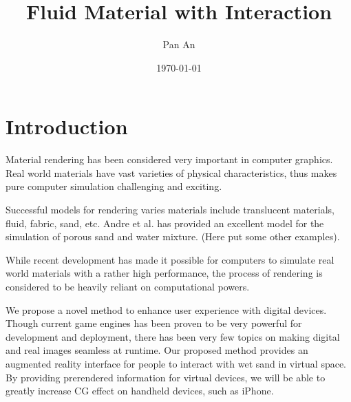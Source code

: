 \documentclass[dvips,12pt]{article}
\begin{document}

\title{Fluid Material with Interaction}
\author{Pan An}
\date{\today}



\maketitle


\section{Introduction}


Material rendering has been considered very important in computer
graphics. Real world materials have vast varieties of physical
characteristics, thus makes pure computer simulation challenging and
exciting.

Successful models for rendering varies materials include translucent
materials, fluid, fabric, sand, etc. Andre et al. has provided an
excellent model for the simulation of porous sand and water
mixture. (Here put some other examples).

While recent development has made it possible for computers to
simulate real world materials with a rather high performance, the
process of rendering is considered to be heavily reliant on
computational powers. 

We propose a novel method to enhance user experience with digital
devices. Though current game engines has been proven to be very
powerful for development and deployment, there has been very few
topics on making digital and real images seamless at runtime. Our
proposed method provides an augmented reality interface for people to
interact with wet sand in virtual space. By providing prerendered
information for virtual devices, we will be able to greatly increase
CG effect on handheld devices, such as iPhone.  
\end{document}
